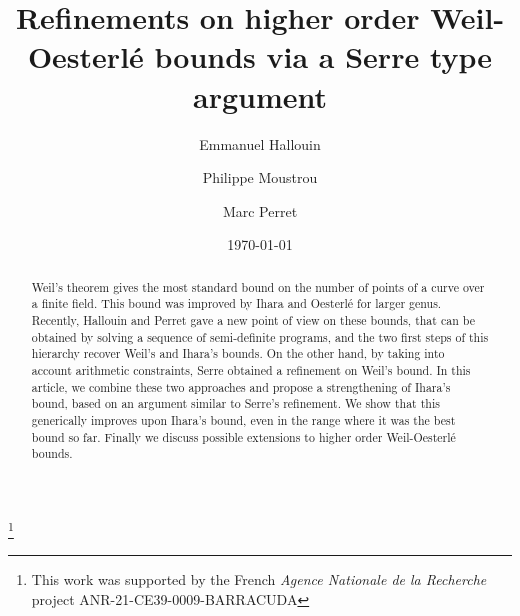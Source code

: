 \documentclass{amsart}
\begin{document}
\title{Refinements on higher order Weil-Oesterl\'e bounds via a Serre type argument}

\address{E.~Hallouin, Institut de Mathe\'ematiques de Toulouse, UMR
  5219, UT2J, 31058 Toulouse, France}

\address{P.~Moustrou, Institut de Mathe\'ematiques de Toulouse, UMR
  5219, UT2J, 31058 Toulouse, France}

\address{M.~Perret, Institut de Mathe\'ematiques de Toulouse, UMR
  5219, UT2J, 31058 Toulouse, France}

\author{Emmanuel Hallouin}
  
\author{Philippe Moustrou}

\author{Marc Perret}

\date{\today}


\thanks{This work was supported by the French \textit{Agence
Nationale de la Recherche} project ANR-21-CE39-0009-BARRACUDA}

\begin{abstract}
Weil's theorem gives the most standard bound on the number of points of a curve over a finite field. 
This bound was improved by Ihara and Oesterl\'e for larger genus. 
Recently, Hallouin and Perret gave a new point of view on these bounds, that can be obtained by solving a sequence of semi-definite programs, and the two first steps of this hierarchy recover Weil's and Ihara's bounds. 
On the other hand, by taking into account arithmetic constraints, Serre obtained a refinement on Weil's bound. 
In this article, we combine these two approaches and propose a strengthening of Ihara's bound, based on an argument similar to Serre's refinement. 
We show that this generically improves upon Ihara's bound, even in the range where it was the best bound so far.
Finally we discuss possible extensions to higher order Weil-Oesterl\'e bounds. 
\end{abstract}

\maketitle




%
%
%
\end{document}
